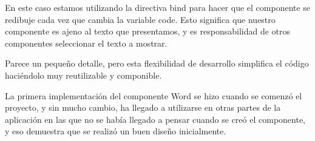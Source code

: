 En este caso estamos utilizando la directiva bind para hacer que el componente se redibuje cada vez que cambia la variable code. Esto significa que nuestro componente es ajeno al texto que presentamos, y es responsabilidad de otros componentes seleccionar el texto a mostrar.

Parece un pequeño detalle, pero esta flexibilidad de desarrollo simplifica el código haciéndolo muy reutilizable y componible.

La primera implementación del componente Word se hizo cuando se comenzó el proyecto,  y sin mucho cambio, ha llegado a utilizarse en otras partes de la aplicación en las que no se había llegado a pensar cuando se creó el componente, y eso demuestra que se realizó un buen diseño inicialmente.
